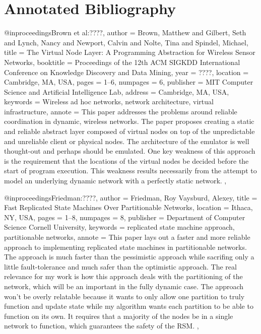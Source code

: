\documentclass[english]{article}
\begin{document}
\section{Annotated Bibliography}



@inproceedings{Brown et al:????,
 author = {Brown, Matthew and Gilbert, Seth and Lynch, Nancy and Newport, Calvin and Nolte, Tina and Spindel, Michael},
 title = {The Virtual Node Layer: A Programming Abstraction for Wireless Sensor Networks},
 booktitle = {Proceedings of the 12th ACM SIGKDD International Conference on Knowledge Discovery and Data Mining},
 year = {????},
 location = {Cambridge, MA, USA},
 pages = {1--6},
 numpages = {6},
 publisher = {MIT Computer Science and Artificial Intelligence Lab},
 address = {Cambridge, MA, USA},
 keywords = {Wireless ad hoc networks, network architecture, virtual infrastructure},
 annote = {This paper addresses the problems around reliable coordination in dynamic, wireless networks. The paper proposes creating a static and reliable abstract layer composed of virtual nodes on top of the unpredictable and unreliable client or physical nodes. The architecture of the emulator is well thought-out and perhaps should be emulated. One key weakness of this approach is the requirement that the locations of the virtual nodes be decided before the start of program execution. This weakness results necessarily from the attempt to model an underlying dynamic network with a perfectly static network. },
}

@inproceedings{Friedman:????,
 author = {Friedman, Roy Vaysburd, Alexey},
 title = {Fast Replicated State Machines Over Partitionable Networks},
 location = {Ithaca, NY, USA},
 pages = {1--8},
 numpages = {8},
 publisher = {Department of Computer Science Cornell University},
 keywords = {replicated state machine approach, partitionable networks},
 annote = { This paper lays out a faster and more reliable approach to implementing replicated state machines in partitionable networks. The approach is much faster than the pessimistic approach while sacrifing only a little fault-tolerance and much safer than the optimistic approach. The real relevance for my work is how this approach deals with the partitioning of the network, which will be an important in the fully dynamic case. The approach won't be overly relatable because it wants to only allow one partition to truly function and update state while my algorithm wants each partition to be able to function on its own. It requires that a majority of the nodes be in a single network to function, which guarantees the safety of the RSM. },
}
\end{document}
